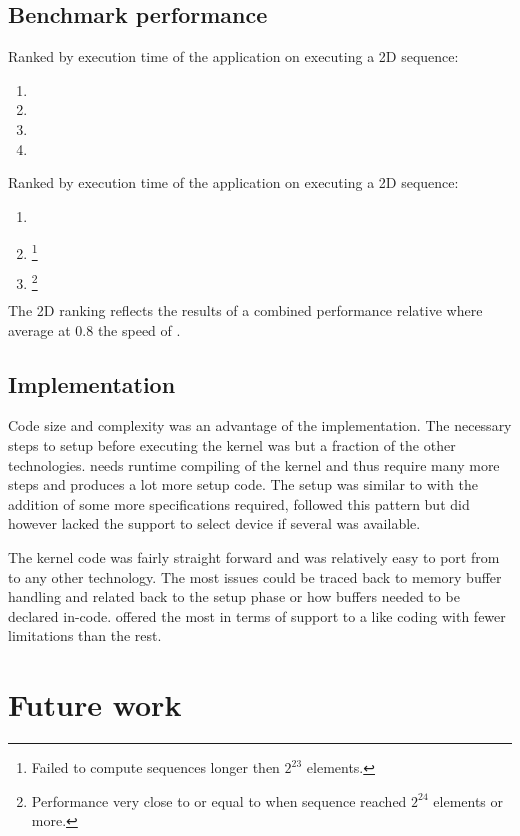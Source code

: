 \subsection{Benchmark performance}

Ranked by execution time of the application on {\NVCARD} executing a \gls{2D} sequence:
\begin{enumerate}	
	\item {\CU}
	\item {\DX}
	\item {\GL}
	\item {\OCL}
\end{enumerate}

Ranked by execution time of the application on {\AMDCARD} executing a \gls{2D} sequence:
\begin{enumerate}	
	\item {\DX}
	\item {\GL}\footnote{Failed to compute sequences longer then $2^{23}$ elements.}
	\item {\OCL}\footnote{Performance very close to or equal to {\DX} when sequence reached $2^{24}$ elements or more.}
\end{enumerate}
The \gls{2D} ranking reflects the results of a combined performance relative {\OCL} where {\DX} average at $0.8$ the speed of {\OCL}.	

\subsection{Implementation}

Code size and complexity was an advantage of the {\CU} implementation. The necessary steps to setup before executing the kernel was but a fraction of the other technologies. {\OCL} needs runtime compiling of the kernel and thus require many more steps and produces a lot more setup code. The {\DX} setup was similar to {\OCL} with the addition of some more specifications required, {\OCL} followed this pattern but did however lacked the support to select device if several was available.

The kernel code was fairly straight forward and was relatively easy to port from {\CU} to any other technology. The most issues could be traced back to memory buffer handling and related back to the setup phase or how buffers needed to be declared in-code. {\CU} offered the most in terms of support to a {\CPP} like coding with fewer limitations than the rest.

\section{Future work}

